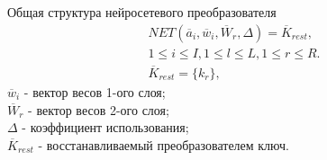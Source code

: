 \begin{frame}{Общая структура нейросетевого преобразователя}
    \begin{gather*}
        NET(\overline{a}_i, \overline{w}_i, \overline{W}_r, \Delta) = \overline{K}_{rest},\\
        1 \leq i \leq I, 1 \leq l \leq L, 1 \leq r \leq R. \\
        \overline{K}_{rest}=\{ k_r \},    
    \end{gather*}
    $\overline{w}_i$ - вектор весов 1-ого слоя; \\
    $\overline{W}_r$ - вектор весов 2-ого слоя; \\
    $\Delta$ - коэффициент использования; \\
    $\overline{K}_{rest}$ - восстанавливаемый преобразователем ключ.        
\end{frame}
